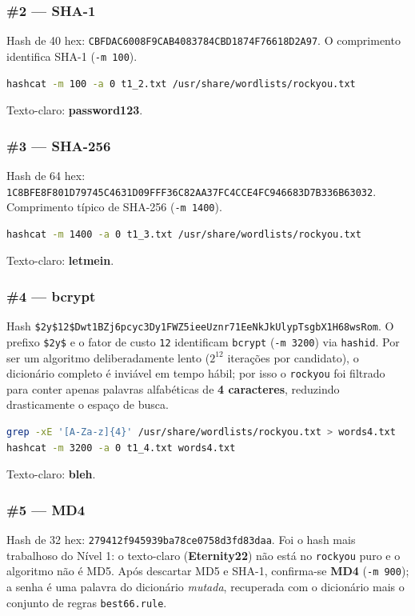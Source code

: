 \documentclass[12pt,a4paper]{article}
\newcommand{\cmd}[1]{\lstinline[style=shell]|#1|}
\begin{document}
\subsubsection{\#2 --- SHA-1}
Hash de 40 hex: \cmd{CBFDAC6008F9CAB4083784CBD1874F76618D2A97}. O comprimento
identifica SHA-1 (\cmd{-m 100}).

\begin{lstlisting}[language=bash,caption={Quebra do hash SHA-1 por dicionário.}]
hashcat -m 100 -a 0 t1_2.txt /usr/share/wordlists/rockyou.txt
\end{lstlisting}
\noindent Texto-claro: \textbf{password123}.

\subsubsection{\#3 --- SHA-256}
Hash de 64 hex: \cmd{1C8BFE8F801D79745C4631D09FFF36C82AA37FC4CCE4FC946683D7B336B63032}.
Comprimento típico de SHA-256 (\cmd{-m 1400}).

\begin{lstlisting}[language=bash,caption={Quebra do hash SHA-256 por dicionário.}]
hashcat -m 1400 -a 0 t1_3.txt /usr/share/wordlists/rockyou.txt
\end{lstlisting}
\noindent Texto-claro: \textbf{letmein}.

\subsubsection{\#4 --- bcrypt}
Hash \cmd{$2y$12$Dwt1BZj6pcyc3Dy1FWZ5ieeUznr71EeNkJkUlypTsgbX1H68wsRom}. O
prefixo \cmd{$2y$} e o fator de custo \cmd{12} identificam \texttt{bcrypt}
(\cmd{-m 3200}) via \texttt{hashid}. Por ser um algoritmo deliberadamente lento
($2^{12}$ iterações por candidato), o dicionário completo é inviável em tempo
hábil; por isso o \texttt{rockyou} foi filtrado para conter apenas palavras
alfabéticas de \textbf{4 caracteres}, reduzindo drasticamente o espaço de busca.

\begin{lstlisting}[language=bash,caption={Filtragem do dicionário e quebra do bcrypt.}]
grep -xE '[A-Za-z]{4}' /usr/share/wordlists/rockyou.txt > words4.txt
hashcat -m 3200 -a 0 t1_4.txt words4.txt
\end{lstlisting}
\noindent Texto-claro: \textbf{bleh}.

\subsubsection{\#5 --- MD4}
Hash de 32 hex: \cmd{279412f945939ba78ce0758d3fd83daa}. Foi o hash mais
trabalhoso do Nível 1: o texto-claro (\textbf{Eternity22}) não está no
\texttt{rockyou} puro e o algoritmo não é MD5. Após descartar MD5 e SHA-1,
confirma-se \textbf{MD4} (\cmd{-m 900}); a senha é uma palavra do dicionário
\emph{mutada}, recuperada com o dicionário mais o conjunto de regras
\cmd{best66.rule}.
\end{document}
